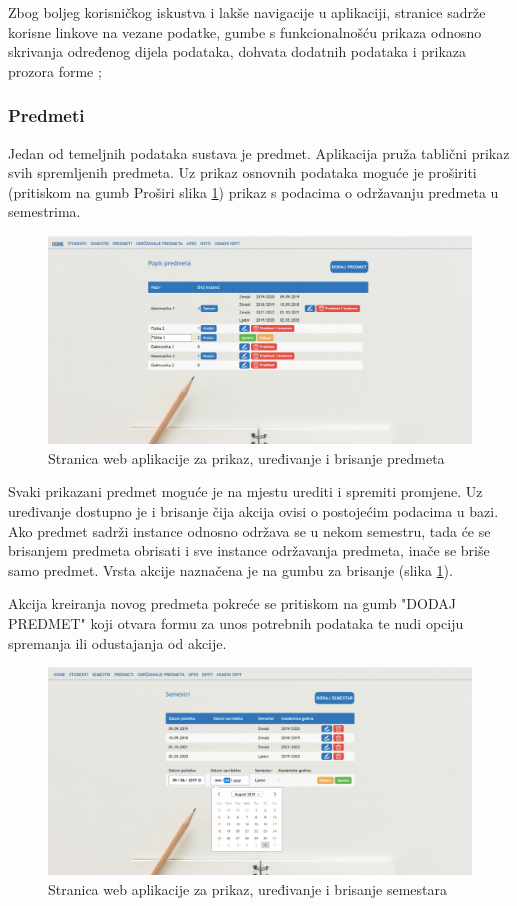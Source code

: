 \documentclass[times, utf8, diplomski]{fer}
\begin{document}
Zbog boljeg korisničkog iskustva i lakše navigacije u aplikaciji, stranice sadrže korisne linkove na vezane podatke, gumbe s funkcionalnošću prikaza odnosno skrivanja određenog dijela podataka, dohvata dodatnih podataka i prikaza prozora forme ;


\subsubsection{Predmeti}
Jedan od temeljnih podataka sustava je predmet. Aplikacija pruža tablični prikaz svih spremljenih predmeta. Uz prikaz osnovnih podataka moguće je proširiti (pritiskom na gumb Proširi slika \ref{fig:course}) prikaz s podacima o održavanju predmeta u semestrima.

\begin{figure}[htb]
\centering
\includegraphics[width=14cm]{predmeti_edit.jpg}
\caption{Stranica web aplikacije za prikaz, uređivanje i brisanje predmeta}
\label{fig:course}
\end{figure}

Svaki prikazani predmet moguće je na mjestu urediti i spremiti promjene. Uz uređivanje dostupno je i brisanje čija akcija ovisi o postojećim podacima u bazi. Ako predmet sadrži instance odnosno održava se u nekom semestru, tada će se brisanjem predmeta obrisati i sve instance održavanja predmeta, inače se briše samo predmet. Vrsta akcije naznačena je na gumbu za brisanje (slika \ref{fig:course}). 

Akcija kreiranja novog predmeta pokreće se pritiskom na gumb "DODAJ PREDMET" koji otvara formu za unos potrebnih podataka te nudi opciju spremanja ili odustajanja od akcije.

\begin{figure}[htb]
\centering
\includegraphics[width=14cm]{semestri_add.jpg}
\caption{Stranica web aplikacije za prikaz, uređivanje i brisanje semestara}
\label{fig:semester}
\end{figure}
\end{document}
